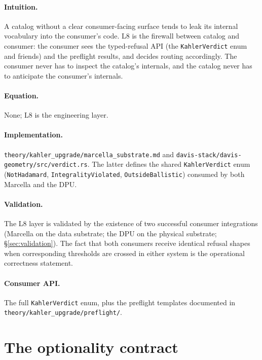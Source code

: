 \documentclass[11pt,letterpaper]{article}
\begin{document}
\paragraph{Intuition.}
A catalog without a clear consumer-facing surface tends to leak its
internal vocabulary into the consumer's code. L8 is the firewall
between catalog and consumer: the consumer sees the typed-refusal
API (the \texttt{KahlerVerdict} enum and friends) and the preflight
results, and decides routing accordingly. The consumer never has
to inspect the catalog's internals, and the catalog never has to
anticipate the consumer's internals.

\paragraph{Equation.}
None; L8 is the engineering layer.

\paragraph{Implementation.}
\texttt{theory/kahler\_upgrade/marcella\_substrate.md} and
\texttt{davis-stack/davis-geometry/src/verdict.rs}. The latter
defines the shared \verb|KahlerVerdict| enum
(\verb|NotHadamard|, \verb|IntegralityViolated|,
\verb|OutsideBallistic|) consumed by both Marcella and the DPU.

\paragraph{Validation.}
The L8 layer is validated by the existence of two successful
consumer integrations (Marcella on the data substrate; the DPU on
the physical substrate; \S\ref{sec:validation}). The fact that
both consumers receive identical refusal shapes when corresponding
thresholds are crossed in either system is the operational
correctness statement.

\paragraph{Consumer API.}
The full \verb|KahlerVerdict| enum, plus the preflight templates
documented in \texttt{theory/kahler\_upgrade/preflight/}.


\section{The optionality contract}
\label{sec:optionality}
\end{document}

